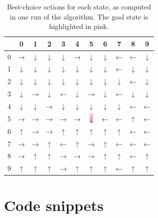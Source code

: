\documentclass[a4paper, 11pt, twocolumn, final]{article} %
\begin{document}
\begin{table}[H]
  \centering
  \begin{tabular}{r | c c c c c c c c c c}
    \hline
      & 0 & 1 & 2 & 3 & 4 & 5 & 6 & 7 & 8 & 9 \\
    \hline
    0 & → & ↓ & ↓ & ↓ & → & ↓ & ↓ & ← & ← & ↓ \\
    1 & ↓ & ↓ & ↓ & ↓ & ↓ & ↓ & ↓ & ← & ↓ & ↓ \\
    2 & ↓ & ↓ & ↓ & ↓ & ↓ & ↓ & ↓ & ↓ & ← & ↓ \\
    3 & ↓ & → & ↓ & ← & ↓ & → & ↓ & ← & ↓ & ↓ \\
    4 & ↓ & ↓ & → & ↓ & ↓ & ↓ & ↓ & ↓ & ← & ← \\
    5 & → & → & → & → & → & \colorbox{pink}{↓} & ← & ← & ↑ & ← \\
    6 & ↑ & → & → & ↑ & ↑ & ↑ & ↑ & ↑ & ← & ← \\
    7 & → & → & ↑ & ← & ↑ & → & ↑ & ← & ← & ← \\
    8 & → & ↑ & ↑ & → & → & → & ↑ & ↑ & ← & ↑ \\
    9 & ↑ & ↑ & ↑ & → & ↑ & ↑ & ↑ & ← & ↑ & ↑ \\
    \hline
  \end{tabular}
  \caption{Best-choice actions for each state, as computed in one run of the
  algorithm.  The goal state is highlighted in pink.}
  \label{tab:computed_directions}
\end{table}

\section{Code snippets} \label{sec:code}
\end{document}
